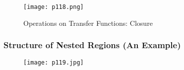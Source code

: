 \begin{figure}[H]
	\centering
	\texttt{[image: p118.png]}
	\caption{Operations on Transfer Functions: Closure}
	\label{fig:p118}
\end{figure}



\subsubsection{Structure of Nested Regions (An Example)}

\begin{figure}[H]
	\centering
	\texttt{[image: p119.jpg]}
	\caption{}
	\label{fig:p119}
\end{figure}